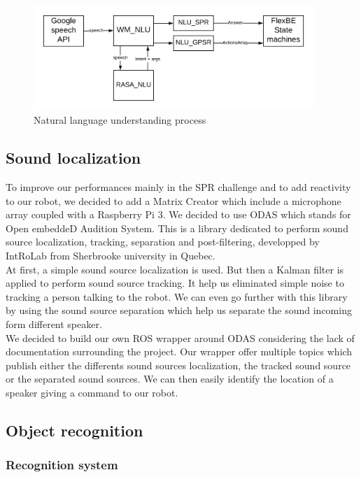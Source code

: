 \documentclass[runningheads,a4paper]{llncs}
\begin{document}
\begin{figure}
  \centering
  \includegraphics[width=300pt]{images/wm_nlu.png}
  \caption{Natural language understanding process}
\end{figure} 

\subsection{Sound localization}
\tab To improve our performances mainly in the SPR challenge and to add reactivity to our robot, we decided to add a Matrix Creator which include a microphone array coupled with a Raspberry Pi 3. We decided to use ODAS  \cite{ODAS} which stands for Open embeddeD Audition System. This is a library dedicated to perform sound source localization, tracking, separation and post-filtering, developped by IntRoLab\cite{Introlab} from Sherbrooke university in Quebec.\\ 

At first, a simple sound source localization is used. But then a Kalman filter is applied to perform sound source tracking. It help us eliminated simple noise to tracking a person talking to the robot. We can even go further with this library by using the sound source separation which help us separate the sound incoming form different speaker.\\

We decided to build our own ROS wrapper around ODAS considering the lack of documentation surrounding the project. Our wrapper offer multiple topics which publish either the differents sound sources localization, the tracked sound source or the separated sound sources. We can then easily identify the location of a speaker giving a command to our robot.\\

\subsection{Object recognition}
\subsubsection{Recognition system}
\hfill\\
\end{document}

